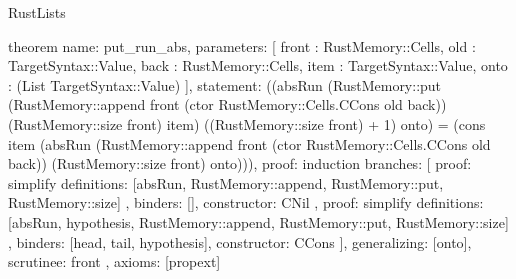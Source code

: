 \begin{lexlean}{RustLists}
\begin{semanticmodule}
theorem{
  name: put_run_abs,
  parameters: [
    front : RustMemory::Cells,
    old : TargetSyntax::Value,
    back : RustMemory::Cells,
    item : TargetSyntax::Value,
    onto : (List TargetSyntax::Value)
  ],
  statement: ((absRun (RustMemory::put (RustMemory::append front (ctor RustMemory::Cells.CCons old back)) (RustMemory::size front) item) ((RustMemory::size front) + 1) onto) = (cons item (absRun (RustMemory::append front (ctor RustMemory::Cells.CCons old back)) (RustMemory::size front) onto))),
  proof: induction{
    branches: [
      {
        proof: simplify{
          definitions: [absRun, RustMemory::append, RustMemory::put, RustMemory::size]
        },
        binders: [],
        constructor: CNil
      },
      {
        proof: simplify{
          definitions: [absRun, hypothesis, RustMemory::append, RustMemory::put, RustMemory::size]
        },
        binders: [head, tail, hypothesis],
        constructor: CCons
      }
    ],
    generalizing: [onto],
    scrutinee: front
  },
  axioms: [propext]
}


\end{semanticmodule}
\end{lexlean}
